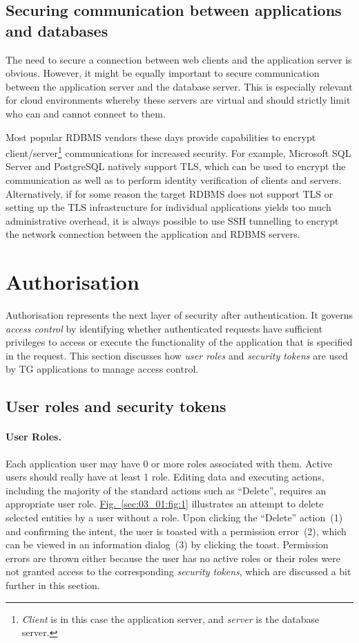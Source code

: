 \documentclass[a4paper,12pt,oneside,openright]{memoir}
\begin{document}
\subsection*{Securing communication between applications and databases}
	The need to secure a connection between web clients and the application server is obvious.
	However, it might be equally important to secure communication between the application server and the database server.
	This is especially relevant for cloud environments whereby these servers are virtual and should strictly limit who can and cannot connect to them.

	Most popular RDBMS vendors these days provide capabilities to encrypt client/server\footnote{\emph{Client} is in this case the application server, and \emph{server} is the database server.} communications for increased security.
	For example, Microsoft SQL Server and PostgreSQL natively support TLS, which can be used to encrypt the communication as well as to perform identity verification of clients and servers.
	Alternatively, if for some reason the target RDBMS does not support TLS or setting up the TLS infrastructure for individual applications yields too much administrative overhead, it is always possible to use SSH tunnelling to encrypt the network connection between the application and RDBMS servers.

\section*{Authorisation}\label{sec:03}

	Authorisation represents the next layer of security after authentication.
	It governs \emph{access control} by identifying whether authenticated requests have sufficient privileges to access or execute the functionality of the application that is specified in the request.
	This section discusses how \emph{user roles} and \emph{security tokens} are used by TG applications to manage access control.

\subsection*{User roles and security tokens}

	\paragraph{User Roles.}
	Each application user may have 0 or more roles associated with them.
	Active users should really have at least 1 role.
	Editing data and executing actions, including the majority of the standard actions such as ``Delete'', requires an appropriate user role.
	\hyperref[sec:03_01:fig:1]{Fig.~\ref*{sec:03_01:fig:1}} illustrates an attempt to delete selected entities by a user without a role.
	Upon clicking the ``Delete'' action~(1) and confirming the intent, the user is toasted with a permission error~(2), which can be viewed in an information dialog~(3) by clicking the toast.
	Permission errors are thrown either because the user has no active roles or their roles were not granted access to the corresponding \emph{security tokens}, which are discussed a bit further in this section.
\end{document}
